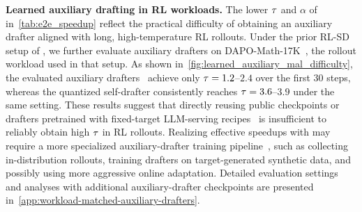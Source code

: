 \textbf{Learned auxiliary drafting in RL workloads.}
The lower $\tau$ and $\alpha$ of \learned{} in~\cref{tab:e2e_speedup} reflect the practical difficulty of obtaining an auxiliary drafter aligned with long, high-temperature RL rollouts.
Under the prior RL-SD setup of \citet{iso2026accelerating}, we further evaluate auxiliary drafters on DAPO-Math-17K~\citep{yu2025dapo}, the rollout workload used in that setup.
As shown in~\cref{fig:learned_auxiliary_mal_difficulty}, the evaluated auxiliary drafters~\citep{redhatai2025llama31eagle3,redhatai2025qwen3eagle3thinking} achieve only $\tau=1.2$--$2.4$ over the first 30 steps, whereas the quantized self-drafter consistently reaches $\tau=3.6$--$3.9$ under the same setting.
These results suggest that directly reusing public checkpoints or drafters pretrained with fixed-target LLM-serving recipes~\citep{li2025eagle,zhang2025fastgrpo} is insufficient to reliably obtain high $\tau$ in RL rollouts.
Realizing effective speedups with \learned{} may require a more specialized auxiliary-drafter training pipeline~\citep{zhou2024distillspec, iso2026accelerating}, such as collecting in-distribution rollouts, training drafters on target-generated synthetic data, and possibly using more aggressive online adaptation.
Detailed evaluation settings and analyses with additional auxiliary-drafter checkpoints are presented in~\cref{app:workload-matched-auxiliary-drafters}.
